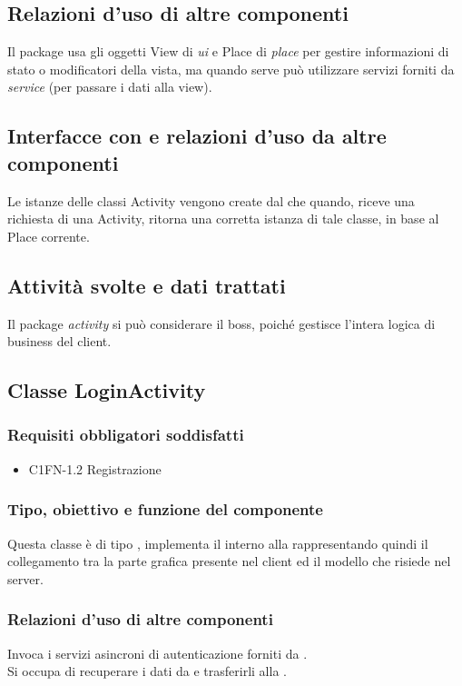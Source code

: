\subsection*{Relazioni d'uso di altre componenti} Il package usa gli oggetti
View di \emph{ui} e Place di \emph{place} per gestire informazioni di stato o
modificatori della vista, ma quando serve pu\`o utilizzare servizi forniti da
\emph{service} (per passare i dati alla view).
\subsection*{Interfacce con e relazioni d'uso da altre componenti} Le istanze
delle classi Activity vengono create dal  che quando,
riceve una richiesta di una Activity, ritorna una corretta istanza di tale
classe, in base al Place corrente.
\subsection*{Attivit\`a svolte e dati trattati} Il package \emph{activity} si
pu\`o considerare il boss, poich\'e gestisce l'intera logica di business del
client.

\subsection{Classe LoginActivity}
\subsubsection*{Requisiti obbligatori soddisfatti}
\begin{itemize}
	\item C1FN-1.2 Registrazione
\end{itemize}
\subsubsection*{Tipo, obiettivo e funzione del componente}
Questa classe \`e di tipo , implementa il 
interno alla  rappresentando quindi il collegamento tra la parte
grafica presente nel client ed il modello che risiede nel server.
\subsubsection*{Relazioni d'uso di altre componenti} Invoca i servizi
asincroni di autenticazione forniti da .\\ Si occupa di
recuperare i dati da  e trasferirli alla . 
